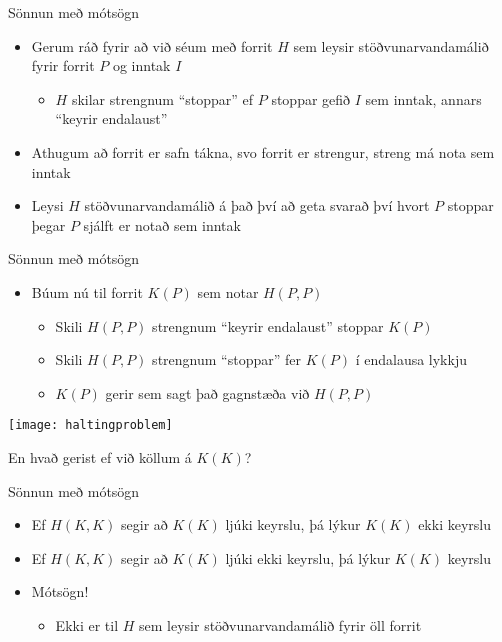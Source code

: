 \documentclass{beamer}
\begin{document}
\begin{frame}{Sönnun með mótsögn}
\begin{itemize}
 \item Gerum ráð fyrir að við séum með forrit $H$ sem leysir stöðvunarvandamálið fyrir forrit $P$ og inntak $I$
 \begin{itemize}
  \item $H$ skilar strengnum ``stoppar'' ef $P$ stoppar gefið $I$ sem inntak, annars ``keyrir endalaust'' \pause
 \end{itemize}
 \item Athugum að forrit er safn tákna, svo forrit er strengur, streng má nota sem inntak
 \item Leysi $H$ stöðvunarvandamálið á það því að geta svarað því hvort $P$ stoppar þegar $P$ sjálft er notað sem inntak
\end{itemize}
\end{frame}

\begin{frame}{Sönnun með mótsögn}
\begin{itemize}
 \item Búum nú til forrit $K(P)$ sem notar $H(P, P)$
 \begin{itemize}
  \item Skili $H(P, P)$ strengnum ``keyrir endalaust'' stoppar $K(P)$ 
  \item Skili $H(P, P)$ strengnum ``stoppar'' fer $K(P)$ í endalausa lykkju
  \item $K(P)$ gerir sem sagt það gagnstæða við $H(P, P)$
 \end{itemize}
\end{itemize}
\texttt{[image: haltingproblem]}

\pause
En hvað gerist ef við köllum á $K(K)$?
\end{frame}

\begin{frame}{Sönnun með mótsögn}
\begin{itemize}
 \item Ef $H(K, K)$ segir að $K(K)$ ljúki keyrslu, þá lýkur $K(K)$ ekki keyrslu
 \item Ef $H(K, K)$ segir að $K(K)$ ljúki ekki keyrslu, þá lýkur $K(K)$ keyrslu
 \item Mótsögn!
 \begin{itemize}
  \item Ekki er til $H$ sem leysir stöðvunarvandamálið fyrir öll forrit
 \end{itemize}
\end{itemize}
\end{frame}
\end{document}
